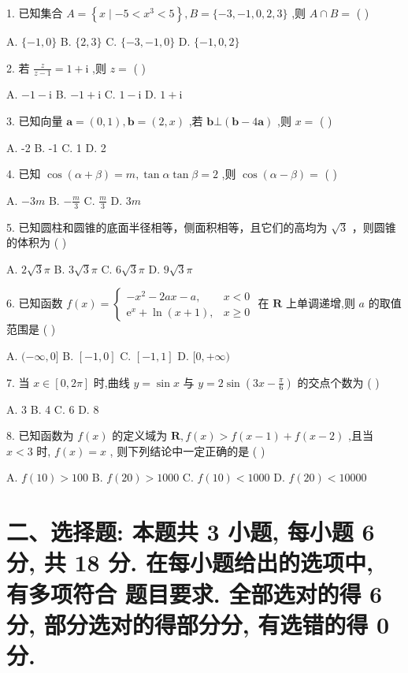 \documentclass[10pt]{article}
\begin{document}
1. 已知集合 \(A = \left\{  {x \mid   - 5 < {x}^{3} < 5}\right\}  ,B = \{  - 3, - 1,0,2,3\}\) ,则 \(A \cap  B =\) ( )

A. \(\{  - 1,0\}\) B. \(\{ 2,3\}\) C. \(\{  - 3, - 1,0\}\) D. \(\{  - 1,0,2\}\)

2. 若 \(\frac{z}{z - 1} = 1 + \mathrm{i}\) ,则 \(z =\) ( )

A. \(- 1 - \mathrm{i}\) B. \(- 1 + \mathrm{i}\) C. \(1 - \mathrm{i}\) D. \(1 + \mathrm{i}\)

3. 已知向量 \(\mathbf{a} = \left( {0,1}\right) ,\mathbf{b} = \left( {2,x}\right)\) ,若 \(\mathbf{b} \bot  \left( {\mathbf{b} - 4\mathbf{a}}\right)\) ,则 \(x =\) ( )

A. -2 B. -1 C. 1 D. 2

4. 已知 \(\cos \left( {\alpha  + \beta }\right)  = m,\tan \alpha \tan \beta  = 2\) ,则 \(\cos \left( {\alpha  - \beta }\right)  =\) ( )

A. \(- {3m}\) B. \(- \frac{m}{3}\) C. \(\frac{m}{3}\) D. \({3m}\)

5. 已知圆柱和圆锥的底面半径相等，侧面积相等，且它们的高均为 \(\sqrt{3}\) ，则圆锥的体积为 ( )

A. \(2\sqrt{3}\pi\) B. \(3\sqrt{3}\pi\) C. \(6\sqrt{3}\pi\) D. \(9\sqrt{3}\pi\)

6. 已知函数 \(f\left( x\right)  = \left\{  \begin{array}{ll}  - {x}^{2} - {2ax} - a, & x < 0 \\  {\mathrm{e}}^{x} + \ln \left( {x + 1}\right) , & x \geq  0 \end{array}\right.\) 在 \(\mathbf{R}\) 上单调递增,则 \(a\) 的取值范围是 ( )

A. \(( - \infty ,0\rbrack\) B. \(\left\lbrack  {-1,0}\right\rbrack\) C. \(\left\lbrack  {-1,1}\right\rbrack\) D. \(\lbrack 0, + \infty )\)

7. 当 \(x \in  \left\lbrack  {0,{2\pi }}\right\rbrack\) 时,曲线 \(y = \sin x\) 与 \(y = 2\sin \left( {{3x} - \frac{\pi }{6}}\right)\) 的交点个数为 ( )

A. 3 B. 4 C. 6 D. 8

8. 已知函数为 \(f\left( x\right)\) 的定义域为 \(\mathbf{R},f\left( x\right)  > f\left( {x - 1}\right)  + f\left( {x - 2}\right)\) ,且当 \(x < 3\) 时, \(f\left( x\right)  = x\) , 则下列结论中一定正确的是 ( )

A. \(f\left( {10}\right)  > {100}\) B. \(f\left( {20}\right)  > {1000}\) C. \(f\left( {10}\right)  < {1000}\) D. \(f\left( {20}\right)  < {10000}\)

\section*{二、选择题: 本题共 3 小题, 每小题 6 分, 共 18 分. 在每小题给出的选项中, 有多项符合 题目要求. 全部选对的得 6 分, 部分选对的得部分分, 有选错的得 0 分.}
\end{document}

